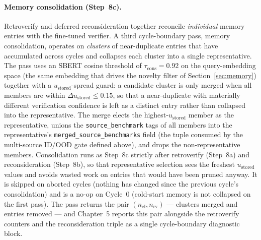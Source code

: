 \paragraph{Memory consolidation (Step~8c).}
Retroverify and deferred reconsideration together reconcile \emph{individual} memory entries with the fine-tuned verifier. A third cycle-boundary pass, memory consolidation, operates on \emph{clusters} of near-duplicate entries that have accumulated across cycles and collapses each cluster into a single representative. The pass uses an SBERT cosine threshold of $\tau_{\text{cons}} = 0.92$ on the query-embedding space (the same embedding that drives the novelty filter of Section~\ref{sec:memory}) together with a $u_{\text{stored}}$-spread guard: a candidate cluster is only merged when all members are within $\Delta u_{\text{stored}} \leq 0.15$, so that a near-duplicate with materially different verification confidence is left as a distinct entry rather than collapsed into the representative. The merge elects the highest-$u_{\text{stored}}$ member as the representative, unions the \texttt{source\_benchmark} tags of all members into the representative's \texttt{merged\_source\_benchmarks} field (the tuple consumed by the multi-source ID/OOD gate defined above), and drops the non-representative members. Consolidation runs as Step~8c strictly after retroverify (Step~8a) and reconsideration (Step~8b), so that representative selection sees the freshest $u_{\text{stored}}$ values and avoids wasted work on entries that would have been pruned anyway. It is skipped on aborted cycles (nothing has changed since the previous cycle's consolidation) and is a no-op on Cycle~0 (cold-start memory is not collapsed on the first pass). The pass returns the pair $(n_{\text{cl}}, n_{\text{rv}})$ --- clusters merged and entries removed --- and Chapter~5 reports this pair alongside the retroverify counters and the reconsideration triple as a single cycle-boundary diagnostic block.

